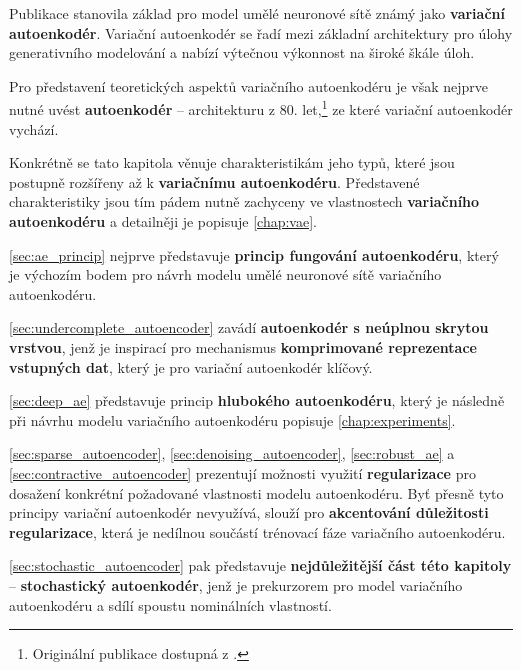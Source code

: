 Publikace \textcite{Kingma2014} stanovila základ pro model umělé neuronové sítě známý jako \textbf{variační autoenkodér}.
Variační autoenkodér se řadí mezi základní architektury pro úlohy generativního modelování a nabízí výtečnou výkonnost na široké škále úloh. \cite{Kingma2014, Kingma2019}

Pro představení teoretických aspektů variačního autoenkodéru je však nejprve nutné uvést \textbf{autoenkodér} – architekturu z 80. let,\footnote{Originální publikace dostupná z \cite{Rumelhart1987}.} ze které variační autoenkodér vychází.

Konkrétně se tato kapitola věnuje charakteristikám jeho typů, které jsou postupně rozšířeny až k \textbf{variačnímu autoenkodéru}.
Představené charakteristiky jsou tím pádem nutně zachyceny ve vlastnostech \textbf{variačního autoenkodéru} a detailněji je popisuje \autoref{chap:vae}.

\autoref{sec:ae_princip} nejprve představuje \textbf{princip fungování autoenkodéru}, který je výchozím bodem pro návrh modelu umělé neuronové sítě variačního autoenkodéru.

\autoref{sec:undercomplete_autoencoder} zavádí \textbf{autoenkodér s neúplnou skrytou vrstvou}, jenž je inspirací pro mechanismus \textbf{komprimované reprezentace vstupných dat}, který je pro variační autoenkodér klíčový.

\autoref{sec:deep_ae} představuje princip \textbf{hlubokého autoenkodéru}, který je následně při návrhu modelu variačního autoenkodéru popisuje \autoref{chap:experiments}.

\autoref{sec:sparse_autoencoder}, \autoref{sec:denoising_autoencoder}, \autoref{sec:robust_ae} a \autoref{sec:contractive_autoencoder} prezentují možnosti využití \textbf{regularizace} pro dosažení konkrétní požadované vlastnosti modelu autoenkodéru.
Byť přesně tyto principy variační autoenkodér nevyužívá, slouží pro \textbf{akcentování důležitosti regularizace}, která je nedílnou součástí trénovací fáze variačního autoenkodéru.

\autoref{sec:stochastic_autoencoder} pak představuje \textbf{nejdůležitější část této kapitoly} – \textbf{stochastický autoenkodér}, jenž je prekurzorem pro model variačního autoenkodéru a sdílí spoustu nominálních vlastností.
\newpage